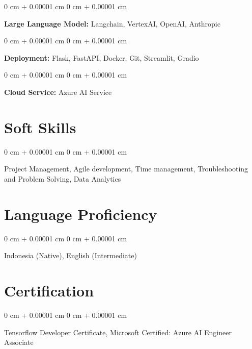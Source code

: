 \documentclass[10pt, letterpaper]{article}
\newenvironment{onecolentry}{
    \begin{adjustwidth}{
        0 cm + 0.00001 cm
    }{
        0 cm + 0.00001 cm
    }
}{
    \end{adjustwidth}
} %
\begin{document}
        \vspace{0.2 cm}

        \begin{onecolentry}
            \textbf{Large Language Model:} Langchain, VertexAI, OpenAI, Anthropic
        \end{onecolentry}

        \vspace{0.2 cm}

        \begin{onecolentry}
            \textbf{Deployment:} Flask, FastAPI, Docker, Git, Streamlit, Gradio
        \end{onecolentry}

        \vspace{0.2 cm}

        \begin{onecolentry}
            \textbf{Cloud Service:} Azure AI Service
        \end{onecolentry}


    
    \section{Soft Skills}



        
        \begin{onecolentry}
            Project Management, Agile development, Time management, Troubleshooting and Problem Solving, Data Analytics
        \end{onecolentry}


    
    \section{Language Proficiency}



        
        \begin{onecolentry}
            Indonesia (Native), English (Intermediate)
        \end{onecolentry}


    
    \section{Certification}



        
        \begin{onecolentry}
            Tensorflow Developer Certificate, Microsoft Certified: Azure AI Engineer Associate
        \end{onecolentry}
\end{document}
